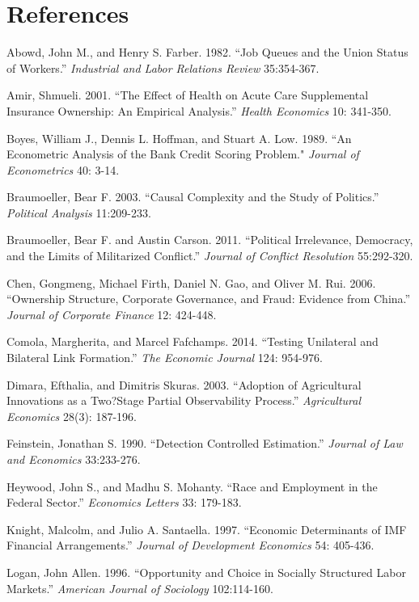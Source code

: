 \documentclass[10pt]{article}
\begin{document}
\section*{References}
\parskip=0.15in
\begin{hangparas}{.25in}{1}

Abowd, John M., and Henry S. Farber. 1982. ``Job Queues and the Union Status of Workers.'' \textit{Industrial and Labor Relations Review} 35:354-367.

Amir, Shmueli. 2001. ``The Effect of Health on Acute Care Supplemental Insurance Ownership: An Empirical Analysis.'' \textit{Health Economics} 10: 341-350.

Boyes, William J., Dennis L. Hoffman, and Stuart A. Low. 1989. ``An Econometric Analysis of the Bank Credit Scoring Problem." \textit{Journal of Econometrics} 40: 3-14.

Braumoeller, Bear F. 2003. ``Causal Complexity and the Study of Politics.'' \textit{Political Analysis} 11:209-233.

Braumoeller, Bear F. and Austin Carson. 2011. ``Political Irrelevance, Democracy, and the Limits of Militarized Conflict.'' \textit{Journal of Conflict Resolution} 55:292-320.

Chen, Gongmeng, Michael Firth, Daniel N. Gao, and Oliver M. Rui. 2006. ``Ownership Structure, Corporate Governance, and Fraud: Evidence from China.'' \textit{Journal of Corporate Finance} 12: 424-448.

Comola, Margherita, and Marcel Fafchamps. 2014. ``Testing Unilateral and Bilateral Link Formation.'' \textit{The Economic Journal} 124: 954-976. 

Dimara, Efthalia, and Dimitris Skuras. 2003. ``Adoption of Agricultural Innovations as a Two?Stage Partial Observability Process.'' \textit{Agricultural Economics} 28(3): 187-196.

Feinstein, Jonathan S. 1990. ``Detection Controlled Estimation.'' \textit{Journal of Law and Economics} 33:233-276.

Heywood, John S., and Madhu S. Mohanty. ``Race and Employment in the Federal Sector.'' \textit{Economics Letters} 33: 179-183.

Knight, Malcolm, and Julio A. Santaella. 1997. ``Economic Determinants of IMF Financial Arrangements.'' \textit{Journal of Development Economics} 54: 405-436.

Logan, John Allen. 1996. ``Opportunity and Choice in Socially Structured Labor Markets.'' \textit{American Journal of Sociology} 102:114-160.


\end{hangparas}
\end{document}
